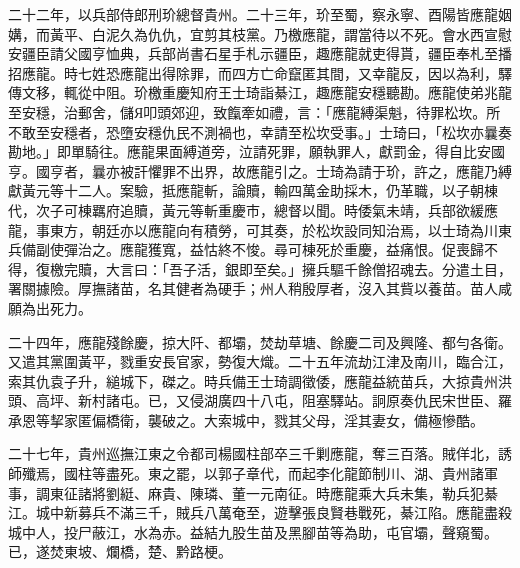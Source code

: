\begin{pinyinscope}
二十二年，以兵部侍郎刑玠總督貴州。二十三年，玠至蜀，察永寧、酉陽皆應龍姻媾，而黃平、白泥久為仇仇，宜剪其枝黨。乃檄應龍，謂當待以不死。會水西宣慰安疆臣請父國亨恤典，兵部尚書石星手札示疆臣，趣應龍就吏得貰，疆臣奉札至播招應龍。時七姓恐應龍出得除罪，而四方亡命竄匿其間，又幸龍反，因以為利，驛傳文移，輒從中阻。玠檄重慶知府王士琦詣綦江，趣應龍安穩聽勘。應龍使弟兆龍至安穩，治郵舍，儲Я叩頭郊迎，致餼牽如禮，言：「應龍縛渠魁，待罪松坎。所不敢至安穩者，恐墮安穩仇民不測禍也，幸請至松坎受事。」士琦曰，「松坎亦曩奏勘地。」即單騎往。應龍果面縛道旁，泣請死罪，願執罪人，獻罰金，得自比安國亨。國亨者，曩亦被訐懼罪不出界，故應龍引之。士琦為請于玠，許之，應龍乃縛獻黃元等十二人。案驗，抵應龍斬，論贖，輸四萬金助採木，仍革職，以子朝棟代，次子可棟羈府追贖，黃元等斬重慶市，總督以聞。時倭氣未靖，兵部欲緩應龍，事東方，朝廷亦以應龍向有積勞，可其奏，於松坎設同知治焉，以士琦為川東兵備副使彈治之。應龍獲寬，益怙終不悛。尋可棟死於重慶，益痛恨。促喪歸不得，復檄完贖，大言曰：「吾子活，銀即至矣。」擁兵驅千餘僧招魂去。分遣土目，署關據險。厚撫諸苗，名其健者為硬手；州人稍殷厚者，沒入其貲以養苗。苗人咸願為出死力。

二十四年，應龍殘餘慶，掠大阡、都壩，焚劫草塘、餘慶二司及興隆、都勻各衛。又遣其黨圍黃平，戮重安長官家，勢復大熾。二十五年流劫江津及南川，臨合江，索其仇袁子升，縋城下，磔之。時兵備王士琦調徵倭，應龍益統苗兵，大掠貴州洪頭、高坪、新村諸屯。已，又侵湖廣四十八屯，阻塞驛站。詗原奏仇民宋世臣、羅承恩等挈家匿偏橋衛，襲破之。大索城中，戮其父母，淫其妻女，備極慘酷。

二十七年，貴州巡撫江東之令都司楊國柱部卒三千剿應龍，奪三百落。賊佯北，誘師殲焉，國柱等盡死。東之罷，以郭子章代，而起李化龍節制川、湖、貴州諸軍事，調東征諸將劉綎、麻貴、陳璘、董一元南征。時應龍乘大兵未集，勒兵犯綦江。城中新募兵不滿三千，賊兵八萬奄至，遊擊張良賢巷戰死，綦江陷。應龍盡殺城中人，投尸蔽江，水為赤。益結九股生苗及黑腳苗等為助，屯官壩，聲窺蜀。已，遂焚東坡、爛橋，楚、黔路梗。


\end{pinyinscope}
